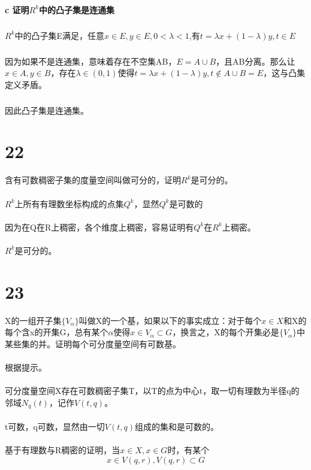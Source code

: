 \paragraph{c 证明$R^k$中的凸子集是连通集} 
\subparagraph{} $R^k$中的凸子集E满足，任意$x \in E,y \in E, 0 < \lambda < 1$,有$t = \lambda x + (1- \lambda)y, t \in E$
\subparagraph{} 因为如果不是连通集，意味着存在不空集AB，$E = A\cup B$，且AB分离。那么让$x \in A, y \in B$，存在$\lambda \in (0, 1)$使得$t = \lambda x + (1 - \lambda) y, t \notin A \cup B = E$，这与凸集定义矛盾。
\subparagraph{} 因此凸子集是连通集。
\section*{22} 含有可数稠密子集的度量空间叫做可分的，证明$R^k$是可分的。
\paragraph{} $R^k$上所有有理数坐标构成的点集$Q^k$，显然$Q^k$是可数的
\paragraph{} 因为在Q在R上稠密，各个维度上稠密，容易证明有$Q^k$在$R^k$上稠密。
\paragraph{} $R^k$是可分的。
\section*{23} X的一组开子集$\{V_{\alpha}\}$叫做X的一个基，如果以下的事实成立：对于每个$x\in X$和X的每个含x的开集G，总有某个$\alpha$使得$x \in V_{\alpha} \subset G$，换言之，X的每个开集必是$\{V_{\alpha}\}$中某些集的并。证明每个可分度量空间有可数基。
\paragraph{} 根据提示。
\paragraph{} 可分度量空间X存在可数稠密子集T，以T的点为中心t，取一切有理数为半径q的邻域$N_q(t)$，记作$V(t,q)$。
\paragraph{} t可数，q可数，显然由一切$V(t,q)$组成的集和是可数的。
\paragraph{} 基于有理数与R稠密的证明，当$x \in X, x \in G$时，有某个$$x \in V(q,r), V(q,r) \subset G$$
